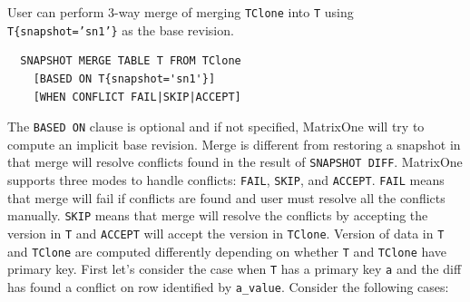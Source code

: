\documentclass[sigconf,nonacm]{acmart} %
\begin{document}
User can perform 3-way merge of merging \texttt{TClone} into \texttt{T}
using \texttt{T\{snapshot='sn1'\}} as the base revision. 
\begin{verbatim}
  SNAPSHOT MERGE TABLE T FROM TClone 
    [BASED ON T{snapshot='sn1'}]
    [WHEN CONFLICT FAIL|SKIP|ACCEPT]
\end{verbatim}
The \texttt{BASED ON} clause is optional and if not specified, MatrixOne will try to 
compute an implicit base revision.  Merge is different from restoring a snapshot in 
that merge will resolve conflicts found in the result of \texttt{SNAPSHOT DIFF}.
MatrixOne supports three modes to handle conflicts: \texttt{FAIL}, \texttt{SKIP}, 
and \texttt{ACCEPT}.  \texttt{FAIL} means that merge will fail if conflicts are found
and user must resolve all the conflicts manually.  \texttt{SKIP} means that merge will 
resolve the conflicts by accepting the version in \texttt{T} and \texttt{ACCEPT} will 
accept the version in \texttt{TClone}.  Version of data in \texttt{T} and \texttt{TClone}
are computed differently depending on whether \texttt{T} and \texttt{TClone} have primary key.
First let's consider the case when \texttt{T} has a primary key \texttt{a} and the diff has
found a conflict on row identified by \texttt{a\_value}.  Consider the following cases:
\end{document}
